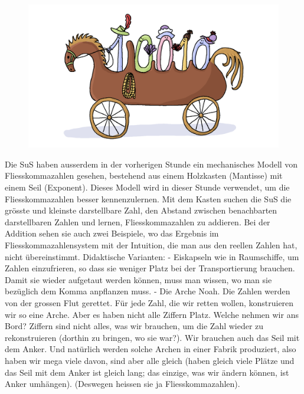 \documentclass{article}
\begin{document}
\begin{figure}[H]
\centering
\includegraphics[width=\textwidth]{Pictures/Kutsche.png} 
\end{figure}

       Die SuS haben ausserdem in der vorherigen Stunde ein mechanisches Modell von Fliesskommazahlen gesehen, bestehend aus einem Holzkasten (Mantisse) mit einem Seil (Exponent).  Dieses Modell wird in dieser Stunde verwendet, um die Fliesskommazahlen besser kennenzulernen.
       Mit dem Kasten suchen die SuS die grösste und kleinste darstellbare Zahl, den Abstand zwischen benachbarten darstellbaren Zahlen und lernen, Fliesskommazahlen zu addieren. Bei der Addition sehen sie auch zwei Beispiele, wo das Ergebnis im Fliesskommazahlensystem mit der Intuition, die man aus den reellen Zahlen hat, nicht übereinstimmt.
Didaktische Varianten:
- Eiskapseln wie in Raumschiffe, um Zahlen einzufrieren, so dass sie weniger Platz bei der Transportierung brauchen. Damit sie wieder aufgetaut werden können, muss man wissen, wo man sie bezüglich dem Komma anpflanzen muss.
- Die Arche Noah. Die Zahlen werden von der grossen Flut gerettet. Für jede Zahl, die wir retten wollen, konstruieren wir so eine Arche. Aber es haben nicht alle Ziffern Platz. Welche nehmen wir ans Bord? Ziffern sind nicht alles, was wir brauchen, um die Zahl wieder zu rekonstruieren (dorthin zu bringen, wo sie war?). Wir brauchen auch das Seil mit dem Anker. Und natürlich werden solche Archen in einer Fabrik produziert, also haben wir mega viele davon, sind aber alle gleich (haben gleich viele Plätze und das Seil mit dem Anker ist gleich lang; das einzige, was wir ändern können, ist Anker umhängen). (Deswegen heissen sie ja Fliesskommazahlen).
\end{document}
